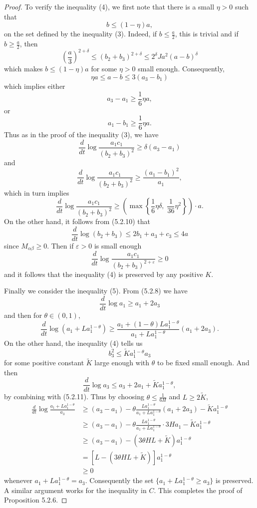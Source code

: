\begin{proof}
To verify the inequality (4), we first note that there is a small
$\eta>0$ such that
$$
b\le (1-\eta)a,
$$
on the set defined by the inequality (3). Indeed, if $b\le
\frac{a}{2}$, this is trivial and if $b\ge\frac{a}{2}$, then
$$
\left(\frac{a}{3}\right)^{2+\delta} \le(b_2+b_3)^{2+\delta}\le 2^\delta
Ja^2(a-b)^\delta
$$
which makes $b\le(1-\eta)a$ for some $\eta>0$ small enough.
Consequently, $$\eta a\le a-b\le 3(a_3-b_1)$$ which implies either
$$
a_3-a_1\ge \frac{1}{6}\eta a,
$$
or
$$
a_1-b_1\ge \frac{1}{6}\eta a.
$$
Thus as in the proof of the inequality (3), we have
$$
\frac{d}{dt}\log\frac{a_1c_1}{(b_2+b_3)^2}\ge \delta(a_3-a_1)
$$
and
$$
\frac{d}{dt}\log\frac{a_1c_1}{(b_2+b_3)^2}\ge
\frac{(a_1-b_1)^2}{a_1},
$$
which in turn implies
$$
\frac{d}{dt}\log\frac{a_1c_1}{(b_2+b_3)^2} \ge
\left(\max\left\{\frac{1}{6}\eta\delta,\;
\frac{1}{36}\eta^2\right\}\right)\cdot a.
$$
On the other hand, it follows from (5.2.10) that
$$
\frac{d}{dt}\log(b_2+b_3)\le 2b_1+a_3+c_3\le 4a
$$
since $M_{\alpha\beta}\ge 0$. Then if $\varepsilon>0$ is small
enough
$$
\frac{d}{dt}\log\frac{a_1c_1}{(b_2+b_3)^{2+\varepsilon}}\ge 0
$$
and it follows that the inequality (4) is preserved by any
positive $K$.

Finally we consider the inequality (5). From (5.2.8) we have
$$
\frac{d}{dt}\log a_1\ge a_1+2a_3
$$
and then for $\theta\in (0,1)$,
$$
\frac{d}{dt}\log (a_1+La_1^{1-\theta})\ge
\frac{a_1+(1-\theta)La_1^{1-\theta}}{a_1+La_1^{1-\theta}}(a_1+2a_3).
$$
On the other hand, the inequality (4) tells us
$$
b_3^2\le \tilde{K}a_1^{1-\theta}a_3
$$
for some positive constant $\tilde{K}$ large enough with $\theta$
to be fixed small enough. And then
$$
\frac{d}{dt}\log a_3\le a_3+2a_1+\tilde{K}a_1^{1-\theta},
$$
by combining with (5.2.11). Thus by choosing
$\theta\le\frac{1}{6H}$ and $L\ge 2\tilde{K}$,
\begin{align*}
\frac{d}{dt}\log \frac{a_1+La_1^{1-\theta}}{a_3}& \ge
(a_3-a_1)-\theta\frac{La_1^{1-\theta}}{a_1+La_1^{1-\theta}}(a_1+2a_3)
-\tilde{K}a_1^{1-\theta}\\
&
\ge(a_3-a_1)-\theta\frac{La_1^{1-\theta}}{a_1+La_1^{1-\theta}}\cdot
3Ha_1-\tilde{K}a_1^{1-\theta}\\
&  \ge (a_3-a_1)-(3\theta HL+\tilde{K})a_1^{1-\theta}\\
&  = [L-(3\theta HL+\tilde{K})]a_1^{1-\theta}\\
&  \ge 0
\end{align*}
whenever $a_1+La_1^{1-\theta}=a_3$. Consequently the set
$\{a_1+La_1^{1-\theta}\ge a_3\}$ is preserved. A similar argument
works for the inequality in $C$. This completes the proof of
Proposition 5.2.6.
\end{proof}

